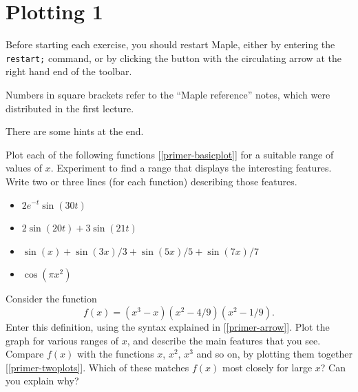 \documentclass[a4paper,10pt]{amsbook}
\begin{document}
\chapter{Plotting 1}

Before starting each exercise, you should restart Maple, either by
entering the \verb~restart;~ command, or by clicking the button with
the circulating arrow at the right hand end of the toolbar.

Numbers in square brackets refer to the ``Maple
reference'' notes, which were distributed in the first lecture.

There are some hints at the end.

\begin{exercise}\label{ex-plot-misc}
 Plot each of the following functions [\ref{primer-basicplot}]
 for a suitable range of values of $x$.  Experiment to find
 a range that displays the interesting features.  Write two
 or three lines (for each function) describing those
 features.
 \begin{itemize}
  \item[(a)] $2e^{-t}\sin(30 t)$ 
  \item[(b)] $2\sin(20 t)+3\sin(21 t)$
  \item[(c)] $\sin(x)+\sin(3x)/3+\sin(5x)/5+\sin(7x)/7$
  \item[(d)] $\cos(\pi x^2)$
 \end{itemize}
\end{exercise}

\begin{exercise}\label{ex-wiggle}
 Consider the function 
 \[ f(x) = (x^3-x)(x^2-4/9)(x^2-1/9). \] Enter this
 definition, using the syntax explained in
 [\ref{primer-arrow}].  Plot the graph for various ranges of
 $x$, and describe the main features that you see.  Compare
 $f(x)$ with the functions $x$, $x^2$, $x^3$ and so on, by
 plotting them together [\ref{primer-twoplots}].  Which of
 these matches $f(x)$ most closely for large $x$?  Can you
 explain why?  
\end{exercise}
\end{document}
